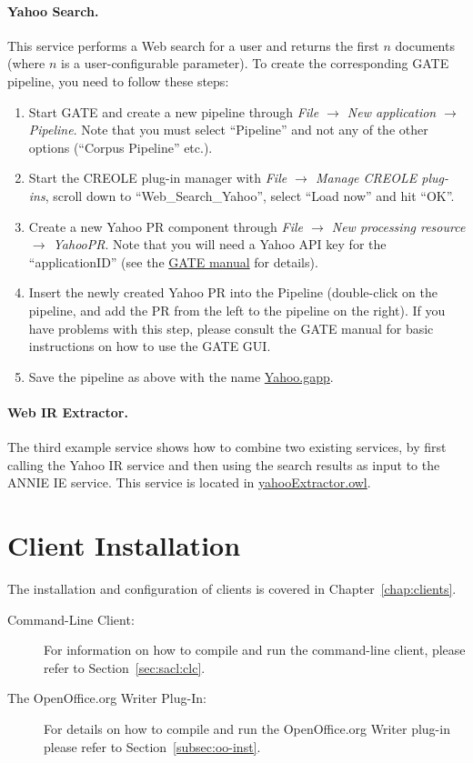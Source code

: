 \paragraph{Yahoo Search.} This service performs a Web search for a
user and returns the first $n$ documents (where $n$ is a
user-configurable parameter). To create the corresponding GATE
pipeline, you need to follow these steps:
\begin{enumerate}
\item Start GATE and create a new pipeline through \emph{File
    $\rightarrow$ New application $\rightarrow$ Pipeline}. Note that
  you must select ``Pipeline'' and not any of the other options
  (``Corpus Pipeline'' etc.).
\item Start the CREOLE plug-in manager with \emph{File
    $\rightarrow$ Manage CREOLE plug-ins}, scroll down to ``Web\_Search\_Yahoo'',
  select ``Load now'' and hit ``OK''.
\item Create a new Yahoo PR component through \emph{File
    $\rightarrow$ New processing resource $\rightarrow$ YahooPR}. Note
  that you will need a Yahoo API key for the ``applicationID'' (see
  the \href{http://gate.ac.uk/sale/tao/splitch19.html#x24-51700019.7}{GATE manual} for details).
\item Insert the newly created Yahoo PR into the Pipeline
  (double-click on the pipeline, and add the PR from the left to the
  pipeline on the right). If you have problems with this step, please
  consult the GATE manual for basic instructions on how to use the
  GATE GUI.
\item Save the pipeline as above with the name \url{Yahoo.gapp}.
\end{enumerate}

\paragraph{Web IR Extractor.} The third example service shows how to
combine two existing services, by first calling the Yahoo IR service
and then using the search results as input to the ANNIE IE
service. This service is located in \url{yahooExtractor.owl}.



\section{Client Installation}
The installation and configuration of clients is covered in
Chapter~\ref{chap:clients}.

\begin{description}
\item[Command-Line Client:] For information on how to compile and run
  the command-line client, please refer to Section~\ref{sec:sacl:clc}.

\item[The OpenOffice.org Writer Plug-In:] For details on how to
  compile and run the OpenOffice.org Writer plug-in please refer to
  Section~\ref{subsec:oo-inst}.
\end{description}









